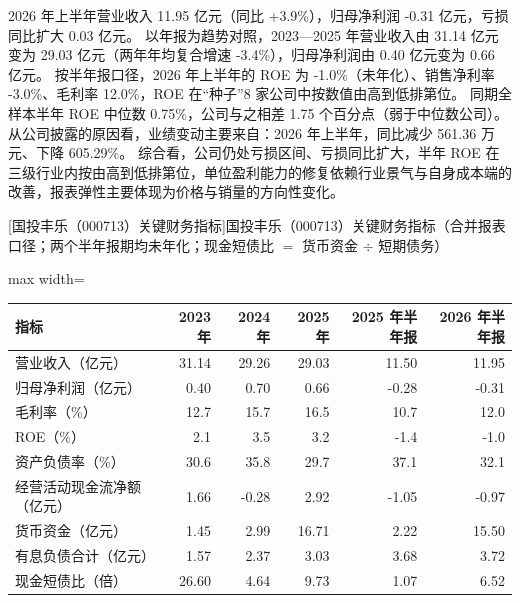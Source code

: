  2026 年上半年营业收入 11.95 亿元（同比 +3.9\%），归母净利润 -0.31 亿元，亏损同比扩大 0.03 亿元。 以年报为趋势对照，2023---2025 年营业收入由 31.14 亿元变为 29.03 亿元（两年年均复合增速 -3.4\%），归母净利润由 0.40 亿元变为 0.66 亿元。 按半年报口径，2026 年上半年的 ROE 为 -1.0\%（未年化）、销售净利率 -3.0\%、毛利率 12.0\%，ROE 在“种子”8 家公司中按数值由高到低排第位。 同期全样本半年 ROE 中位数 0.75\%，公司与之相差 1.75 个百分点（弱于中位数公司）。 从公司披露的原因看，业绩变动主要来自：2026 年上半年，同比减少 561.36 万元、下降 605.29\%。 综合看，公司仍处亏损区间、亏损同比扩大，半年 ROE 在三级行业内按由高到低排第位，单位盈利能力的修复依赖行业景气与自身成本端的改善，报表弹性主要体现为价格与销量的方向性变化。

\begin{center}\small\setlength{\tabcolsep}{3.4pt}
[国投丰乐（000713）关键财务指标]{国投丰乐（000713）关键财务指标（合并报表口径；两个半年报期均未年化；现金短债比 $=$ 货币资金 $\div$ 短期债务）}
\begin{adjustbox}{max width=\textwidth}
\begin{tabular}{@{}lrrrrr@{}}
\toprule
指标 & 2023 年 & 2024 年 & 2025 年 & 2025 年半年报 & 2026 年半年报 \\
\midrule
营业收入（亿元） & 31.14 & 29.26 & 29.03 & 11.50 & 11.95 \\
归母净利润（亿元） & 0.40 & 0.70 & 0.66 & -0.28 & -0.31 \\
毛利率（\%） & 12.7 & 15.7 & 16.5 & 10.7 & 12.0 \\
ROE（\%） & 2.1 & 3.5 & 3.2 & -1.4 & -1.0 \\
资产负债率（\%） & 30.6 & 35.8 & 29.7 & 37.1 & 32.1 \\
经营活动现金流净额（亿元） & 1.66 & -0.28 & 2.92 & -1.05 & -0.97 \\
货币资金（亿元） & 1.45 & 2.99 & 16.71 & 2.22 & 15.50 \\
有息负债合计（亿元） & 1.57 & 2.37 & 3.03 & 3.68 & 3.72 \\
现金短债比（倍） & 26.60 & 4.64 & 9.73 & 1.07 & 6.52 \\
\bottomrule
\end{tabular}
\end{adjustbox}
\end{center}

